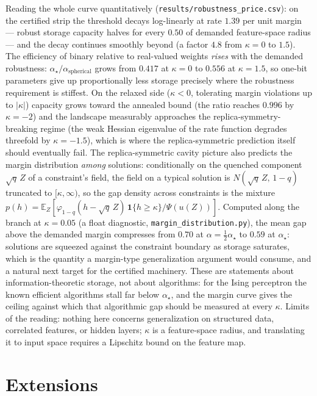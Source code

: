\documentclass[11pt]{article}
\theoremstyle{remark}
\newcommand{\E}{\mathbb{E}}
\begin{document}
Reading the whole curve quantitatively
(\texttt{results/robustness\_price.csv}): on the certified strip the
threshold decays log-linearly at rate $1.39$ per unit margin ---
robust storage capacity halves for every $0.50$ of demanded
feature-space radius --- and the decay continues smoothly beyond (a
factor $4.8$ from $\kappa=0$ to $1.5$).  The efficiency of binary
relative to real-valued weights \emph{rises} with the demanded
robustness: $\alpha_\star/\alpha_{\mathrm{spherical}}$ grows from
$0.417$ at $\kappa=0$ to $0.556$ at $\kappa=1.5$, so one-bit
parameters give up proportionally less storage precisely where the
robustness requirement is stiffest.  On the relaxed side ($\kappa<0$,
tolerating margin violations up to $|\kappa|$) capacity grows toward
the annealed bound (the ratio reaches $0.996$ by $\kappa=-2$) and the
landscape measurably approaches the replica-symmetry-breaking regime
(the weak Hessian eigenvalue of the rate function degrades threefold
by $\kappa=-1.5$), which is where the replica-symmetric prediction
itself should eventually fail.
The replica-symmetric cavity picture also predicts the margin
distribution \emph{among} solutions: conditionally on the quenched
component $\sqrt{q}\,Z$ of a constraint's field, the field on a
typical solution is $N(\sqrt q\,Z,\,1-q)$ truncated to $[\kappa,
\infty)$, so the gap density across constraints is the mixture
$p(h)=\E_Z[\varphi_{1-q}(h-\sqrt q\,Z)\,\mathbf 1\{h\ge\kappa\}/
\Psi(u(Z))]$.  Computed along the branch at $\kappa=0.05$ (a float
diagnostic, \texttt{margin\_distribution.py}), the mean gap above the
demanded margin compresses from $0.70$ at $\alpha=\tfrac12
\alpha_\star$ to $0.59$ at $\alpha_\star$: solutions are squeezed
against the constraint boundary as storage saturates, which is the
quantity a margin-type generalization argument would consume, and a
natural next target for the certified machinery.  These are
statements about information-theoretic storage, not about
algorithms: for the Ising perceptron the known efficient algorithms
stall far below $\alpha_\star$, and the margin curve gives the
ceiling against which that algorithmic gap should be measured at
every $\kappa$.  Limits of the reading: nothing here concerns
generalization on structured data, correlated features, or hidden
layers; $\kappa$ is a feature-space radius, and translating it to
input space requires a Lipschitz bound on the feature map.



\section{Extensions}\label{sec:extensions}
\end{document}
